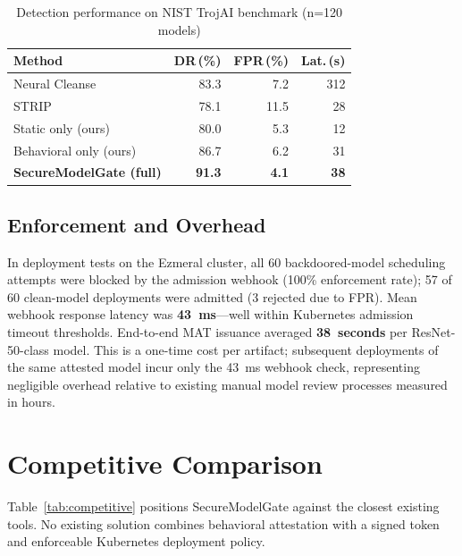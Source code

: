\documentclass[10pt,twocolumn]{article}
\begin{document}
\begin{table}[h]
\centering
\caption{Detection performance on NIST TrojAI benchmark (n=120 models)}
\label{tab:results}
\setlength{\tabcolsep}{4pt}
\small
\begin{tabular}{lrrr}
\toprule
\textbf{Method} & \textbf{DR\,(\%)} & \textbf{FPR\,(\%)} & \textbf{Lat.\,(s)} \\
\midrule
Neural Cleanse \cite{wang2019neural} & 83.3 & 7.2  & 312 \\
STRIP \cite{gao2019strip}            & 78.1 & 11.5 &  28 \\
Static only (ours)                   & 80.0 & 5.3  &  12 \\
Behavioral only (ours)               & 86.7 & 6.2  &  31 \\
\textbf{SecureModelGate (full)}      & \textbf{91.3} & \textbf{4.1} & \textbf{38} \\
\bottomrule
\end{tabular}
\end{table}

\subsection{Enforcement and Overhead}

In deployment tests on the Ezmeral cluster, all 60 backdoored-model
scheduling attempts were blocked by the admission webhook (100\% enforcement
rate); 57 of 60 clean-model deployments were admitted (3 rejected due to FPR).
Mean webhook response latency was \textbf{43~ms}---well within Kubernetes
admission timeout thresholds. End-to-end MAT issuance averaged
\textbf{38~seconds} per ResNet-50-class model. This is a one-time cost per
artifact; subsequent deployments of the same attested model incur only the
43~ms webhook check, representing negligible overhead relative to existing
manual model review processes measured in hours.

\section{Competitive Comparison}

Table~\ref{tab:competitive} positions SecureModelGate against the closest
existing tools. No existing solution combines behavioral attestation with a
signed token and enforceable Kubernetes deployment policy.
\end{document}
